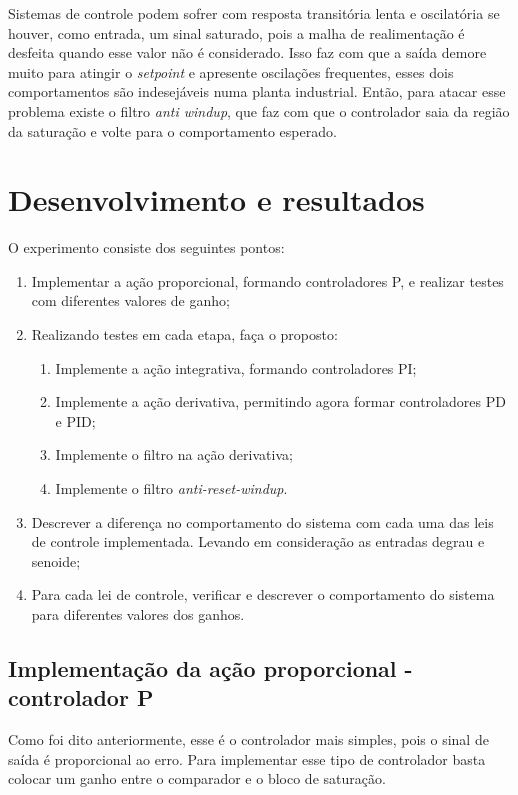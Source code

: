 \documentclass[
	12pt,				%
	openany,			%
	oneside,			%
	a4paper,			%
	english,			%
	french,				%
	spanish,			%
	brazil,				%
	]{abntex2}
\begin{document}
{Sistemas de controle podem sofrer com resposta transitória lenta e oscilatória se houver, como entrada, um sinal saturado, pois a malha de realimentação é desfeita quando esse valor não é considerado. Isso faz com que a saída demore muito para atingir o \textit{setpoint} e apresente oscilações frequentes, esses dois comportamentos são indesejáveis numa planta industrial. Então, para atacar esse problema existe o filtro \textit{anti windup}, que faz com que o controlador saia da região da saturação e volte para o comportamento esperado.

\chapter{Desenvolvimento e resultados}

O experimento consiste dos seguintes pontos:
\begin{enumerate}
    \item Implementar a ação proporcional, formando controladores P, e realizar testes com diferentes valores de ganho;
    \item Realizando testes em cada etapa, faça o proposto:
    \begin{enumerate}
        \item Implemente a ação integrativa, formando controladores PI;
        \item Implemente a ação derivativa, permitindo agora formar controladores PD e PID;
        \item Implemente o filtro na ação derivativa;
        \item Implemente o filtro \textit{anti-reset-windup}.
    \end{enumerate}
    \item Descrever a diferença no comportamento do sistema com cada uma das leis de controle implementada. Levando em consideração as entradas degrau e senoide;
    \item Para cada lei de controle, verificar e descrever o comportamento do sistema para diferentes valores dos ganhos.
\end{enumerate}
\section{Implementação da ação proporcional - controlador P}

Como foi dito anteriormente, esse é o controlador mais simples, pois o sinal de saída é proporcional ao erro. Para implementar esse tipo de controlador basta colocar um ganho entre o comparador e o bloco de saturação.

}
\end{document}
